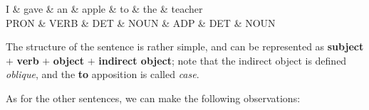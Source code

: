 \documentclass[
12pt,
a4paper,
oneside,
headinclude,
footinclude]{article}
\begin{document}
    \begin{center}
        \scalebox{1.1} {
        \begin{dependency}[theme = simple]
            \begin{deptext}[column sep=1em, row sep=0.5ex]
                I \& gave \& an \& apple \& to \& the \& teacher \\
                PRON \& VERB \& DET \& NOUN \& ADP \& DET \& NOUN \\
            \end{deptext}
        \end{dependency}
        }
    \end{center}

    The structure of the sentence is rather simple, and can be represented as \textbf{subject} $+$ \textbf{verb} $+$ \textbf{object} $+$ \textbf{indirect object}; note that the indirect object is defined \textit{oblique}, and the \textbf{to} apposition is called \textit{case}.
    
    As for the other sentences, we can make the following observations:
    
\end{document}

